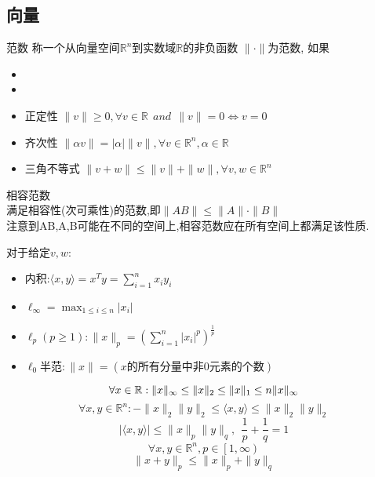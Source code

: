 \documentclass{mytemplate}
\begin{document}
\subsection{向量}
\begin{definition}{范数}
    称一个从向量空间$\mathbb{R}^n$到实数域$\mathbb{R}$的非负函数
    $\|\cdot\|$为范数, 如果
    \begin{itemize}
        \item
        \item
        \item 正定性 $\|v\| \geq 0, \forall v \in \mathbb{R}\ \  and \ \  \|v\| = 0 \Leftrightarrow v=0$
        \item 齐次性 $\|\alpha v\| = |\alpha|\|v\|, \forall v \in \mathbb{R}^n, \alpha \in \mathbb{R}$
        \item 三角不等式 $\|v+w\| \leq \|v\|+\|w\|, \forall v,w \in \mathbb{R}^n$
    \end{itemize}
\end{definition}
\begin{definition}{相容范数}
    \\ \vspace*{1em}\hspace*{2em} 满足相容性(次可乘性)的范数,即$\|AB\| \leq \|A\| \cdot \|B\| $
    \\\hspace*{2em} 注意到AB,A,B可能在不同的空间上,相容范数应在所有空间上都满足该性质.
\end{definition}
对于给定$v, w$:
\begin{itemize}
    \item 内积:$\langle x,y\rangle = x^Ty=\sum_{i=1}^{n}x_i y_i$
    \item $\ell_{\infty}=\max_{1\leq i \leq n} |x_i|$
    \item $\ell_{p}(p \geq 1): \|x\|_p = \left(\sum_{i=1}^{n}|x_i|^p\right)^{\frac{1}{p}}$
    \item $\ell_0\text{半范}:\|x\|=(x\text{的所有分量中非0元素的个数})$
\end{itemize}

\begin{proposition}
    $$
        \forall x \in \mathbb{R}:\\
        \|x\|_\infty \leq \|x\|_2\leq\|x\|_1\leq n\|x\|_\infty
    $$
    $$
        \forall x,y \in \mathbb{R}^n:
        -\|x\|_2\|y\|_2\leq \langle  x, y \rangle \leq \|x\|_2 \|y\|_2
    $$
    $$
        |\langle x, y \rangle| \leq \|x\|_p \|y\|_q, \ \
        \frac{1}{p} + \frac{1}{q} = 1
    $$
    \noindent
    $$
        \forall x, y\in \mathbb{R}^n, p\in \left[1, \infty \right)
    $$
    \[
        \|x+y\|_p \leq \|x\|_p + \|y\|_q
    \]
\end{proposition}
\end{document}
